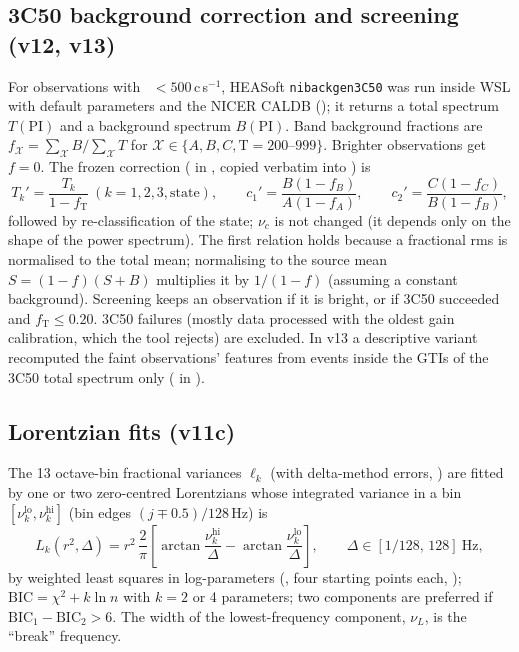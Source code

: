 \subsection{3C50 background correction and screening (v12, v13)}\label{sec:3c50}
For observations with ~$<500$\,c\,s$^{-1}$, HEASoft \texttt{nibackgen3C50} \citep{Remillard2022} was run
inside WSL with default parameters and the NICER CALDB (); it returns a total spectrum
$T(\mathrm{PI})$ and a background spectrum $B(\mathrm{PI})$. Band background fractions are
$f_\mathcal{X}=\sum_{\mathcal X}B/\sum_{\mathcal X}T$ for $\mathcal X\in\{A,B,C,\text{T}=200\text{--}999\}$. Brighter
observations get $f=0$. The frozen correction ( in , copied verbatim into
) is
\begin{equation}
T_k' = \frac{T_k}{1-f_\mathrm{T}}\ (k=1,2,3,\text{state}),\qquad
c_1' = \frac{B(1-f_B)}{A(1-f_A)},\qquad c_2' = \frac{C(1-f_C)}{B(1-f_B)},\label{eq:3c50}
\end{equation}
followed by re-classification of the state; $\nu_c$ is not changed (it depends only on the shape of the power spectrum).
The first relation holds because a fractional rms is normalised to the total mean; normalising to the source mean
$S=(1-f)(S+B)$ multiplies it by $1/(1-f)$ (assuming a constant background). Screening keeps an observation if it is bright,
or if 3C50 succeeded and $f_\mathrm{T}\le0.20$. 3C50 failures (mostly data processed with the oldest gain calibration,
which the tool rejects) are excluded. In v13 a descriptive variant recomputed the faint observations' features from
events inside the GTIs of the 3C50 total spectrum only ( in ).

\subsection{Lorentzian fits (v11c)}\label{sec:lorentz}
The 13 octave-bin fractional variances $\ell_k$ (with delta-method errors, ) are fitted by one or two
zero-centred Lorentzians whose integrated variance in a bin $[\nu^{\mathrm{lo}}_k,\nu^{\mathrm{hi}}_k]$ (bin edges
$(j\mp0.5)/128$\,Hz) is
\begin{equation}
L_k(r^2,\Delta) = r^2\,\frac{2}{\pi}\left[\arctan\frac{\nu^{\mathrm{hi}}_k}{\Delta}-\arctan\frac{\nu^{\mathrm{lo}}_k}{\Delta}\right],
\qquad \Delta\in[1/128,\,128]\ \mathrm{Hz}, \label{eq:lorentz}
\end{equation}
by weighted least squares in log-parameters (, four starting points each,
); $\mathrm{BIC}=\chi^2+k\ln n$ with $k=2$ or 4 parameters; two components are preferred if
$\mathrm{BIC}_1-\mathrm{BIC}_2>6$. The width of the lowest-frequency component, $\nu_L$, is the ``break'' frequency.

